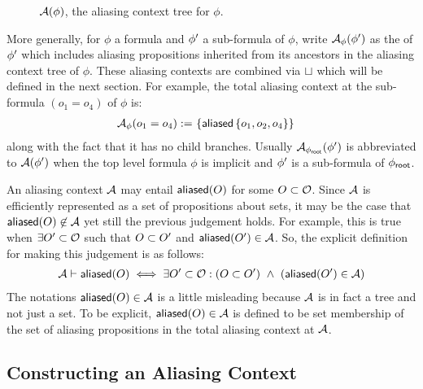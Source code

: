 %
\begin{figure}[h!]
  \label{fig:aliasing-context-example}
  \caption{$\mathcal{A}(\phi)$, the aliasing context tree for $\phi$.}
  \vspace{1em}
  
\end{figure}
%
More generally, for $\phi$ a formula and $\phi^\prime$ a sub-formula of $\phi$, write $\mathcal{A}_\phi(\phi^\prime)$ as the  of $\phi^\prime$ which includes aliasing propositions inherited from its ancestors in the aliasing context tree of $\phi$. These aliasing contexts are combined via $\sqcup$ which will be defined in the next section.
For example, the total aliasing context at the sub-formula $(o_1 = o_4)$ of $\phi$ is:
\begin{align*}
  \mathcal{A}_\phi(o_1 = o_4) := & \
  \{
    \textsf{aliased}\left\{ o_1, o_2, o_4 \right\}
  \}
\end{align*}
along with the fact that it has no child branches.
Usually $\mathcal{A}_{\phi_\textsf{root}}(\phi^\prime)$ is abbreviated to $\mathcal{A}(\phi^\prime)$ when the top level formula $\phi$ is implicit and $\phi^\prime$ is a sub-formula of ${\phi_\textsf{root}}$.

An aliasing context $\mathcal{A}$ may entail $\textsf{aliased}(O)$ for some $O \subset \mathcal{O}$.
Since $\mathcal{A}$ is efficiently represented as a set of propositions about sets, it may be the case that $\textsf{aliased}(O) \not\in \mathcal{A}$ yet still the previous judgement holds.
For example, this is true when $\exists O^\prime \subset \mathcal{O}$ such that $O \subset O^\prime$ and $\textsf{aliased}(O^\prime) \in \mathcal{A}$. So, the explicit definition for making this judgement is as follows:
\begin{align*}
\mathcal{A} \vdash \textsf{aliased}(O)
\iff
\exists O^\prime \subset \mathcal{O} : (O \subset O^\prime) \ \land \ (\textsf{aliased}(O^\prime) \in \mathcal{A})
\end{align*}
The notations $\textsf{aliased}(O) \in \mathcal{A}$ is a little misleading because $\mathcal{A}$ is in fact a tree and not just a set. To be explicit, $\textsf{aliased}(O) \in \mathcal{A}$ is defined to be set membership of the set of aliasing propositions in the total aliasing context at $\mathcal{A}$.

\subsection{Constructing an Aliasing Context}

